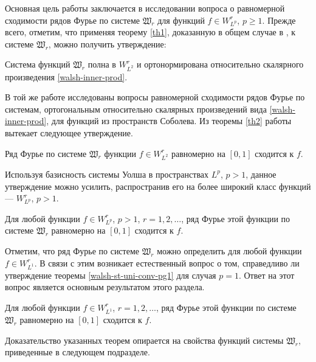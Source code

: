 Основная цель работы заключается в исследовании вопроса о равномерной сходимости рядов Фурье по системе $\mathfrak{W}_r$ для функций $f \in W^r_{L^p}$, $p \ge 1$.
Прежде всего, отметим, что применяя теорему \ref{th1}, доказанную в общем случае в \cite{walsh-ShII-2018-IzvRan}, к системе $\mathfrak{W}_r$, можно получить утверждение:
\begin{statement}
	Система функций $\mathfrak{W}_r$ полна в $W_{L^2}^r$ и ортонормирована относительно скалярного произведения \eqref{walsh-inner-prod}.
\end{statement}
В той же работе исследованы вопросы равномерной сходимости рядов Фурье по системам, ортогональным относительно скалярных произведений вида \eqref{walsh-inner-prod}, для функций из пространств Соболева. Из теоремы \ref{th2} работы \cite{walsh-ShII-2018-IzvRan} вытекает следующее утверждение.
\begin{statement}
	Ряд Фурье по системе $\mathfrak{W}_r$ функции $f \in W_{L^2}^r$ равномерно на $[0,1]$ сходится к $f$.
\end{statement}



Используя базисность системы Уолша в пространствах $L^p$, $p>1$, данное утверждение можно усилить, распространив его на более широкий класс функций --- $W^r_{L^p}$, $p>1$.
\begin{theorem}\label{walsh-st-uni-conv-pg1}
	Для любой функции $f \in W_{L^p}^r$, $p>1$, $r=1,2,\ldots$, ряд Фурье этой функции по системе $\mathfrak{W}_r$ равномерно на $[0,1]$ сходится к $f$.
\end{theorem}

Отметим, что ряд Фурье по системе $\mathfrak{W}_r$ можно определить для любой функции $f \in W^r_{L^1}$. В связи с этим возникает естественный вопрос о том, справедливо ли утверждение теоремы \ref{walsh-st-uni-conv-pg1} для случая $p=1$. Ответ на этот вопрос является основным результатом этого раздела.
\begin{theorem}\label{walsh-st-main}
	Для любой функции $f \in W_{L^1}^r$, $r=1,2,\ldots$, ряд Фурье этой функции по системе $\mathfrak{W}_r$ равномерно на $[0,1]$ сходится к $f$.
\end{theorem}

Доказательство указанных теорем опирается на свойства функций системы $\mathfrak{W}_r$, приведенные в следующем подразделе.


